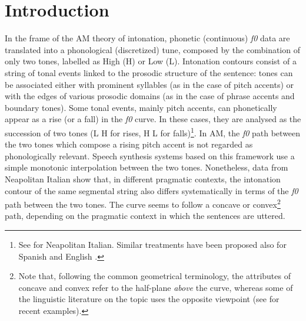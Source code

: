 \section{Introduction}\label{sec21}
In the frame of the AM theory of intonation, phonetic (continuous) \textit{f0} data are translated into a phonological (discretized) tune, composed by the combination of only two tones, labelled as High (H) or Low (L). Intonation contours consist of a string of tonal events linked to the prosodic structure of the sentence: tones can be associated either with prominent syllables (as in the case of pitch accents) or with the edges of various prosodic domains (as in the case of phrase accents and boundary tones). Some tonal events, mainly pitch accents, can phonetically appear as a rise (or a fall) in the \textit{f0} curve. In these cases, they are analysed as the succession of two tones (L H for rises, H L for falls)\footnote{See \citet{dimperio1999tonal} for Neapolitan Italian. Similar treatments have been proposed also for Spanish \citep{hualde2002intonation,face2001focus} and English \citep{ladd2003sagging}.}. In AM, the \textit{f0} path between the two tones which compose a rising pitch accent is not regarded as phonologically relevant. Speech synthesis systems based on this framework \citep{pierrehumbert1981synthesizing,anderson1984synthesis,black1996generating} use a simple monotonic interpolation between the two tones. Nonetheless, data from Neapolitan Italian \citep{dimperio2008phonetics} show that, in different pragmatic contexts, the intonation contour of the same segmental string also differs systematically in terms of the \textit{f0} path between the two tones. The curve seems to follow a concave or convex\footnote{Note that, following the common geometrical terminology, the attributes of concave and convex refer to the half-plane \textit{above} the curve, whereas some of the linguistic literature on the topic uses the opposite viewpoint (see \citealt{grice2000place,dombrowski2005acoustic} for recent examples).} path, depending on the pragmatic context in which the sentences are uttered.

